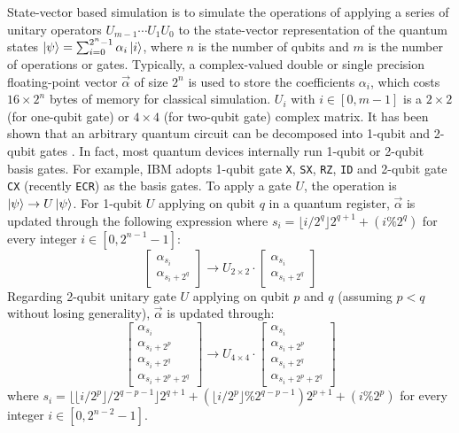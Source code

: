 State-vector based simulation is to simulate the operations of applying a series of unitary operators $U_{m-1} \cdots U_1 U_0$ to the state-vector representation of the quantum states $\ket{\psi}=\sum_{i=0}^{2^n-1}\alpha_i\ket{i}$, where $n$ is the number of qubits and $m$ is the number of operations or gates. Typically, a complex-valued double or single precision floating-point vector $\vec{\alpha}$ of size $2^n$ is used to store the coefficients $\alpha_i$, which costs $16\times2^n$ bytes of memory for classical simulation. $U_i$ with $i\in[0,m-1]$ is a $2\times2$ (for one-qubit gate) or $4\times4$ (for two-qubit gate) complex matrix. It has been shown that an arbitrary quantum circuit can be decomposed into 1-qubit and 2-qubit gates \cite{barenco1995elementary}. In fact, most quantum devices internally run 1-qubit or 2-qubit basis gates. For example, IBM adopts 1-qubit gate \texttt{X}, \texttt{SX}, \texttt{RZ}, \texttt{ID} and 2-qubit gate \texttt{CX} (recently \texttt{ECR}) as the basis gates. To apply a gate $U$, the operation is $\ket{\psi}\to U\ket{\psi}$. For 1-qubit $U$ applying on qubit $q$ in a quantum register, $\vec{\alpha}$ is updated through the following expression where $s_i=\lfloor i/{2^q}\rfloor 2^{q+1}+(i \% 2^q)$ for every integer $i\in[0, 2^{n-1}-1]$:
\begin{equation}
\begin{bmatrix}
\alpha_{s_i} \\
\alpha_{s_i+2^q}  
\end{bmatrix}
\to
U_{2\times2}\cdot \begin{bmatrix}
\alpha_{s_i} \\
\alpha_{s_i+2^q}  
\end{bmatrix}
\label{eq:1q-op}
\end{equation}
Regarding 2-qubit unitary gate $U$ applying on qubit $p$ and $q$ (assuming $p<q$ without losing generality), $\vec{\alpha}$ is updated  through:
\begin{equation}
\begin{bmatrix}
\alpha_{s_i} \\
\alpha_{s_i+2^p} \\
\alpha_{s_i+2^q} \\
\alpha_{s_i+2^p+2^q}
\end{bmatrix}
\to
U_{4\times4}\cdot \begin{bmatrix}
\alpha_{s_i} \\
\alpha_{s_i+2^p} \\
\alpha_{s_i+2^q} \\
\alpha_{s_i+2^p+2^q}
\end{bmatrix}
\label{eq:2q-op}
\end{equation}
where $s_i{=}\lfloor \lfloor i/{2^p}\rfloor /2^{q-p-1} \rfloor  2^{q+1} + (\lfloor i/{2^p}\rfloor \% 2^{q-p-1})2^{p+1} +  (i \% 2^p)$ for every integer $i\in[0,2^{n-2}-1]$. 

